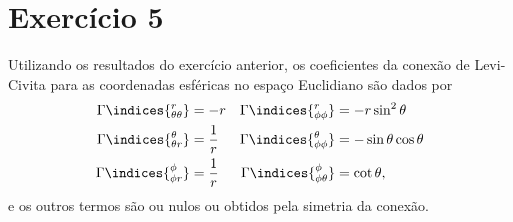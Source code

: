 \section*{Exercício 5}
Utilizando os resultados do exercício anterior, os coeficientes da conexão de Levi-Civita para as coordenadas esféricas no espaço Euclidiano são dados por
\begin{align*}
    \Gamma\indices{^r_{\theta\theta}} &= -r & \Gamma\indices{^r_{\phi\phi}} &= -r\sin^2\theta\\
    \Gamma\indices{^\theta_{\theta r}} &= \frac{1}{r} & \Gamma\indices{^\theta_{\phi\phi}} &= -\sin\theta\cos\theta\\
    \Gamma\indices{^\phi_{\phi r}} &= \frac{1}{r} & \Gamma\indices{^\phi_{\phi\theta}} &=  \cot\theta,
\end{align*}
e os outros termos são ou nulos ou obtidos pela simetria da conexão.

